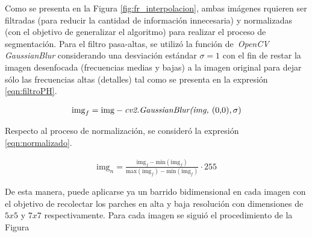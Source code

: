 Como se presenta en la Figura \ref{fig:fr_interpolacion}, ambas imágenes 
rquieren ser filtradas (para reducir la cantidad de información innecesaria)
y normalizadas (con el objetivo de generalizar el algoritmo) para realizar el
proceso de segmentación. Para el filtro pasa-altas, se utilizó la función de\
\emph{OpenCV} \emph{GaussianBlur} considerando una desviación estándar $\sigma = 1$
con el fin de restar la imagen desenfocada (frecuencias medias y bajas) a la imagen 
original para dejar sólo las frecuencias altas (detalles) tal como se presenta
en la expresión \eqref{eqn:filtroPH}.

\begin{align}
    \label{eqn:filtroPH}
    \text{img}_f = \text{img} - \text{\emph{cv2.GaussianBlur(img, }(0,0),}\, \sigma)
\end{align}

Respecto al proceso de normalización, se consideró la expresión \eqref{eqn:normalizado}.

\begin{align}
    \label{eqn:normalizado}
    \text{img}_n = \frac{\text{img}_f-\text{min}(\text{img}_f)}{\text{max}(\text{img}_f)-\text{min}(\text{img}_f)}\cdot 255
\end{align}

De esta manera, puede aplicarse ya un barrido bidimensional en cada imagen 
con el objetivo de recolectar los parches en alta y baja resolución con 
dimensiones de $5x5$ y $7x7$ respectivamente. Para cada imagen se siguió el 
procedimiento de la Figura

